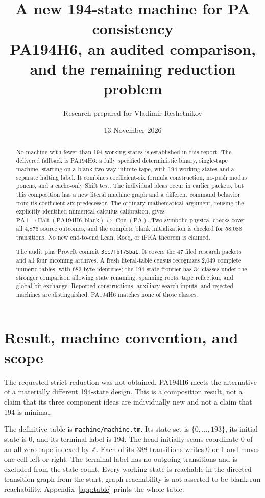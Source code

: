 \documentclass[11pt,letterpaper]{article}
\title{A new 194-state machine for PA consistency\\[4pt]\large PA194H6, an audited comparison, and the remaining reduction problem}
\author{Research prepared for Vladimir Reshetnikov}
\date{13 November 2026}
\newcommand{\PA}{\mathrm{PA}}
\newcommand{\Con}{\operatorname{Con}}
\newcommand{\Halt}{\operatorname{Halt}}
\newcommand{\file}[1]{\nolinkurl{#1}}
\begin{document}
\maketitle
\begin{abstract}
No machine with fewer than 194 working states is established in this report.
The delivered fallback is PA194H6: a fully specified deterministic binary,
single-tape machine, starting on a blank two-way infinite tape, with 194
working states and a separate halting label. It combines coefficient-six
formula construction, no-push modus ponens, and a cache-only Shift test.
The individual ideas occur in earlier packets, but this composition has a
new literal machine graph and a different command behavior from its
coefficient-six predecessor. The ordinary mathematical argument, reusing
the explicitly identified numerical-calculus calibration, gives
\(\PA\vdash\neg\Halt(\mathrm{PA194H6},\mathrm{blank})\leftrightarrow\Con(\PA)\).
Two symbolic physical checks cover all 4,876 source outcomes, and the
complete blank initialization is checked for 58,088 transitions. No new
end-to-end Lean, Rocq, or iPRA theorem is claimed.

The audit pins ProveIt commit \texttt{3cc7fbf75ba1}. It covers the 47 filed
research packets and all four incoming archives. A fresh literal-table
census recognizes 2,049 complete numeric tables, with 683 byte identities;
the 194-state frontier has 34 classes under the stronger comparison
allowing state renaming, spanning roots, tape reflection, and global bit
exchange. Reported constructions, auxiliary search inputs, and rejected
machines are distinguished. PA194H6 matches none of those classes.
\end{abstract}
\setcounter{tocdepth}{1}
\tableofcontents
\newpage

\section{Result, machine convention, and scope}

The requested strict reduction was not obtained. PA194H6 meets the alternative
of a materially different 194-state design. This is a composition result,
not a claim that its three component ideas are individually new and not a
claim that 194 is minimal.

The definitive table is \file{machine/machine.tm}. Its state set is
\(\{0,\ldots,193\}\), its initial state is 0, and its terminal label is 194.
The head initially scans coordinate 0 of an all-zero tape indexed by
\(\mathbb Z\). Each of its 388 transitions writes 0 or 1 and moves one cell
left or right. The terminal label has no outgoing transitions and is excluded
from the state count. Every working state is reachable in the directed
transition graph from the start; graph reachability is not asserted to be
blank-run reachability. Appendix~\ref{app:table} prints the whole table.
\end{document}
